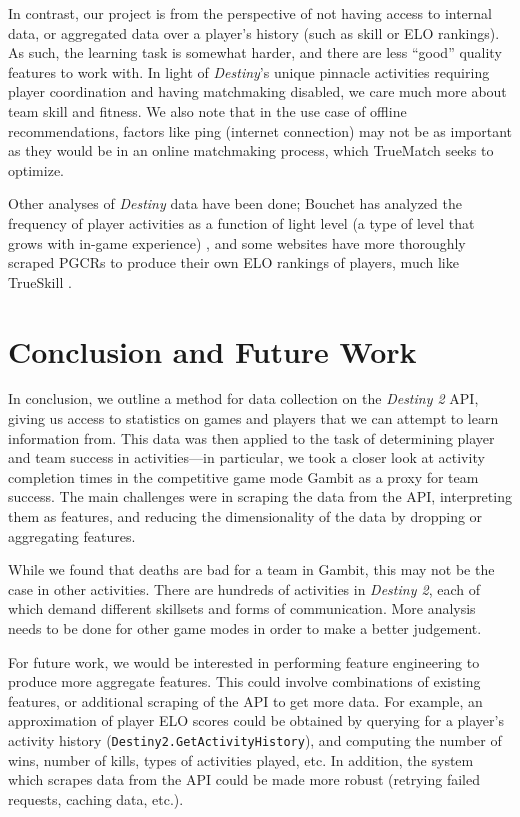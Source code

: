 \documentclass[conference]{IEEEtran}
\begin{document}
In contrast, our project is from the perspective of not having access to
internal data, or aggregated data over a player's history (such as skill or ELO
rankings). As such, the learning task is somewhat harder, and there are less
``good'' quality features to work with. In light of \textit{Destiny}'s
unique pinnacle activities requiring player coordination and having matchmaking
disabled, we care much more about team skill and fitness. We also note that in
the use case of offline recommendations, factors like ping (internet
connection) may not be as important as they would be in an online matchmaking
process, which TrueMatch seeks to optimize.

Other analyses of \textit{Destiny} data have been done; Bouchet has
analyzed the frequency of player activities as a function of light level (a
type of level that grows with in-game experience) \cite{data-anal}, and
some websites have more thoroughly scraped PGCRs to produce their own ELO
rankings of players, much like TrueSkill \cite{tracker}.

\section{Conclusion and Future Work}\label{CFW}

In conclusion, we outline a method for data collection on the
\textit{Destiny 2} API, giving us access to statistics on games and
players that we can attempt to learn information from. This data was then
applied to the task of determining player and team success in activities—in
particular, we took a closer look at activity completion times in the
competitive game mode Gambit as a proxy for team success. The main challenges 
were in scraping the data from the API, interpreting them as features, and 
reducing the dimensionality of the data by dropping or aggregating features.

While we found that deaths are bad for a team in Gambit, this may not be the
case in other activities. There are hundreds of activities in
\textit{Destiny 2}, each of which demand different skillsets and forms of
communication. More analysis needs to be done for other game modes in order to
make a better judgement.

For future work, we would be interested in performing feature engineering to
produce more aggregate features. This could involve combinations of existing
features, or additional scraping of the API to get more data. For example, an
approximation of player ELO scores could be obtained by querying for a player's
activity history (\texttt{Destiny2.GetActivityHistory}), and computing the number of wins,
number of kills, types of activities played, etc. In addition, the system which
scrapes data from the API could be made more robust (retrying failed requests,
caching data, etc.).
\end{document}
